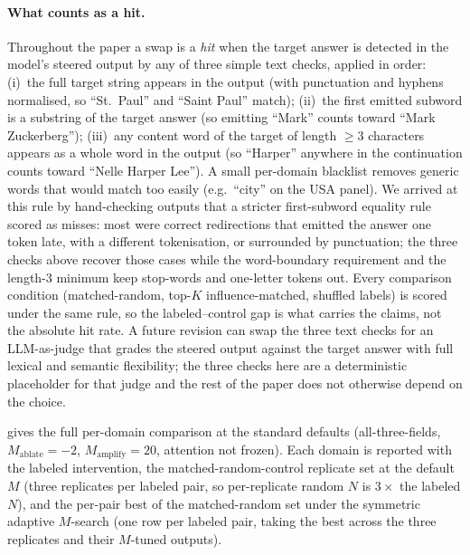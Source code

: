 \paragraph{What counts as a hit.}
Throughout the paper a swap is a \emph{hit} when the target answer is
detected in the model's steered output by any of three simple text
checks, applied in order: (i)~the full target string appears in the
output (with punctuation and hyphens normalised, so ``St.\ Paul'' and
``Saint Paul'' match); (ii)~the first emitted subword is a substring
of the target answer (so emitting ``Mark'' counts toward ``Mark
Zuckerberg''); (iii)~any content word of the target of length
$\geq 3$ characters appears as a whole word in the output (so
``Harper'' anywhere in the continuation counts toward ``Nelle Harper
Lee''). A small per-domain blacklist removes generic words that would
match too easily (e.g.\ ``city'' on the USA panel). We arrived at
this rule by hand-checking outputs that a stricter first-subword
equality rule scored as misses: most were correct redirections that
emitted the answer one token late, with a different tokenisation, or
surrounded by punctuation; the three checks above recover those cases
while the word-boundary requirement and the length-$3$ minimum keep
stop-words and one-letter tokens out. Every comparison condition
(matched-random, top-$K$ influence-matched, shuffled labels) is
scored under the same rule, so the labeled--control gap is what
carries the claims, not the absolute hit rate. A future revision can
swap the three text checks for an LLM-as-judge that grades the
steered output against the target answer with full lexical and
semantic flexibility; the three checks here are a deterministic
placeholder for that judge and the rest of the paper does not
otherwise depend on the choice.

 gives the full per-domain comparison at the standard defaults (all-three-fields, $M_{\mathrm{ablate}}{=}-2$, $M_{\mathrm{amplify}}{=}20$, attention not frozen). Each domain is reported with the labeled intervention, the matched-random-control replicate set at the default $M$ (three replicates per labeled pair, so per-replicate random $N$ is $3\times$ the labeled $N$), and the per-pair best of the matched-random set under the symmetric adaptive $M$-search (one row per labeled pair, taking the best across the three replicates and their $M$-tuned outputs).

